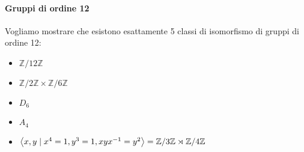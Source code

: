 \paragraph{Gruppi di ordine 12}
Vogliamo mostrare che esistono esattamente 5 classi di isomorfismo di gruppi di
ordine 12:
\begin{itemize}[label = --]
    \item \(\mathbb{Z} / 12\mathbb{Z}\)
    \item \(\mathbb{Z} / 2\mathbb{Z} \times \mathbb{Z} / 6\mathbb{Z}\)
    \item \(D_{6}\) 
    \item \(A_{4}\) 
    \item \({\left\langle x, y \mid x^4 = 1, y^3=1, xyx^{-1} = y^2\right\rangle} = \mathbb{Z} / 3
        \mathbb{Z} \rtimes \mathbb{Z}/ 4 \mathbb{Z}\) 
\end{itemize}
